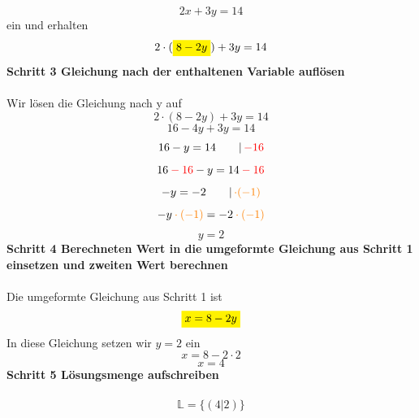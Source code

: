 \documentclass[a4paper,10pt]{article}
\begin{document}
\begin{multicols}{3}
    \[2x + 3y = 14\]
    ein und erhalten
    \[2 \cdot ({\colorbox{yellow}{$8 - 2y$}}) + 3y = 14\]
    \textbf{Schritt 3 Gleichung nach der enthaltenen Variable auflösen}\\~\\
    Wir lösen die Gleichung nach y auf
    \[2 \cdot (8 - 2y) + 3y = 14\]
    \[16 - 4y + 3y = 14\]
    \[16 - y = 14 \qquad |\, {\color{red}-16}\]
    \[16 {\color{red}\: - \: 16} - y = 14 {\color{red}\: - \: 16}\]
    \[-y = -2 \qquad |\, {\color{orange}\cdot (-1)}\]
    \[-y {\color{orange}\: \cdot \: (-1)} = -2 {\color{orange} \: \cdot \: (-1)}\]
    \[y = 2\]
    \textbf{Schritt 4 Berechneten Wert in die umgeformte Gleichung aus Schritt 1 einsetzen und zweiten Wert berechnen}\\~\\
    Die umgeformte Gleichung aus Schritt 1 ist
    \[{\colorbox{yellow}{$x = 8 - 2y$}}\]
    In diese Gleichung setzen wir $y = 2$ ein
    \[x = 8 - 2 \cdot 2\]
    \[x = 4\]
    \textbf{Schritt 5 Lösungsmenge aufschreiben}\\~\\
    \[\mathbb{L} = \{(4|2)\}\]

\end{multicols}
\end{document}
